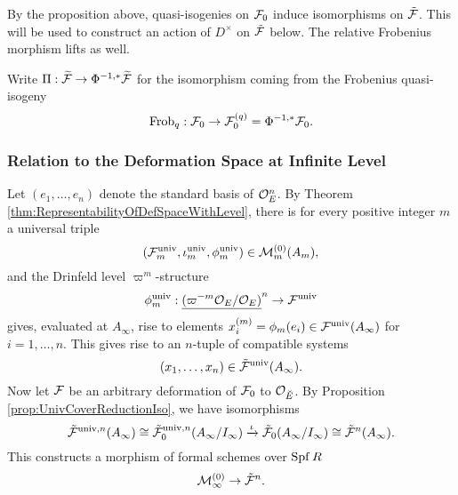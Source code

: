 \documentclass[../main.tex]{subfiles}
\begin{document}
By the proposition above, quasi-isogenies on $\mathcal{F}_0$ induce isomorphisms on 
$\tilde {\mathcal{F}}$. This will be used to construct an action of $D^\times$ on 
$\tilde {\mathcal{F}}$ below. 
The relative Frobenius morphism lifts as well.
\begin{defi} \label{def:FrobOnUnivCov}
  Write $\Pi: \widetilde{\mathcal{F}} \to \Phi^{-1,*}\widetilde{\mathcal{F}}$ for the isomorphism coming from
  the Frobenius quasi-isogeny 
  \begin{equation*}
    \mathrm{Frob}_q: \mathcal{F}_0 \to \mathcal{F}_0^{(q)} = \Phi^{-1,*} \mathcal{F}_0.
  \end{equation*}
\end{defi}




\subsubsection{Relation to the Deformation Space at Infinite Level} %
\label{ssub:Relation to the Deformation Space at Infinite Level}
Let $(e_1, \dots, e_n)$ denote the standard basis of $\mathcal{O}_E^n$. By 
Theorem \ref{thm:RepresentabilityOfDefSpaceWithLevel}, there is for
every positive integer $m$ a universal triple 
$$(\mathcal{F}^{\mathrm{univ}}_m, \iota^{{\mathrm{univ}}}_m, \phi^{\mathrm{univ}}_m) \in \mathcal{M}_{m}^{(0)}(A_m),$$
 and the Drinfeld level
  $\varpi^m$-structure 
\begin{equation*}
  \phi_m^{\mathrm{univ}}: \underline{(\varpi^{-m}\mathcal{O}_{E}/\mathcal{O}_E)}^n \to \mathcal{F}^{\mathrm{univ}}
\end{equation*}
gives, evaluated at $A_\infty$, rise to elements $x_i^{(m)} = \phi_m(e_i) \in
\mathcal{F}^{{\mathrm{univ}}}(A_\infty)$ for $i = 1, \dots, n$. This gives rise to an $n$-tuple 
of compatible systems
\begin{equation*}
  (x_1, \dots, x_n) \in \tilde {\mathcal{F}}^{\mathrm{univ}} (A_\infty). 
\end{equation*}
Now let $\mathcal{F}$ be an arbitrary deformation of $\mathcal{F}_0$ to $\mathcal{O}_{{\breve {E}}}$. By 
Proposition \ref{prop:UnivCoverReductionIso}, we have isomorphisms
\begin{equation*}
  \tilde {\mathcal{F}}^{{\mathrm{univ}},n}(A_\infty) \cong \tilde {\mathcal{F}}_0^{{\mathrm{univ}}, n}(A_\infty/I_\infty)
  \xrightarrow{\iota} \tilde {\mathcal{F}}_0(A_\infty/I_\infty)
  \cong \tilde {\mathcal{F}}^n(A_\infty).
\end{equation*}
This constructs a morphism of formal schemes over $\operatorname{Spf} R$
\begin{equation} \label{eq:MapFromMtoTildeF}
  \mathcal{M}_\infty^{(0)} \to \tilde {\mathcal{F}}^n.
\end{equation}
\end{document}
